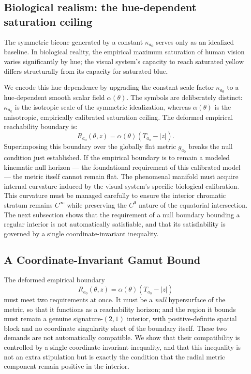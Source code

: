 \documentclass[preprint,12pt,authoryear]{elsarticle}
\theoremstyle{plain}
\theoremstyle{definition}
\theoremstyle{remark}
\begin{document}
\subsection{Biological realism: the hue-dependent saturation ceiling}
\label{subsec:biological-realism-squashing-function}

The symmetric bicone generated by a constant $\kappa_{a_0}$ serves only as an idealized baseline. In biological reality, the empirical maximum saturation of human vision varies significantly by hue; the visual system's capacity to reach saturated yellow differs structurally from its capacity for saturated blue.

We encode this hue dependence by upgrading the constant scale factor $\kappa_{a_0}$ to a hue-dependent smooth scalar field $\alpha(\theta)$. The symbols are deliberately distinct: $\kappa_{a_0}$ is the isotropic scale of the symmetric idealization, whereas $\alpha(\theta)$ is the anisotropic, empirically calibrated saturation ceiling. The deformed empirical reachability boundary is:
\[
R_{a_0}(\theta,z)=\alpha(\theta)(T_{a_0}-|z|).
\]
Superimposing this boundary over the globally flat metric $g_{a_0}$ breaks the null condition just established. If the empirical boundary is to remain a modeled kinematic null horizon --- the foundational requirement of this calibrated model --- the metric itself cannot remain flat. The phenomenal manifold must acquire internal curvature induced by the visual system's specific biological calibration. This curvature must be managed carefully to ensure the interior chromatic stratum remains $C^\infty$ while preserving the $C^0$ nature of the equatorial intersection. The next subsection shows that the requirement of a null boundary bounding a regular interior is not automatically satisfiable, and that its satisfiability is governed by a single coordinate-invariant inequality.

\subsection{A Coordinate-Invariant Gamut Bound}
\label{subsec:eikonal-constraint}

\noindent The deformed empirical boundary
\[
R_{a_0}(\theta,z)=\alpha(\theta)(T_{a_0}-|z|)
\]
must meet two requirements at once. It must be a \emph{null} hypersurface of the metric, so that it functions as a reachability horizon; and the region it bounds must remain a genuine signature-$(2,1)$ interior, with positive-definite spatial block and no coordinate singularity short of the boundary itself. These two demands are not automatically compatible. We show that their compatibility is controlled by a single coordinate-invariant inequality, and that this inequality is not an extra stipulation but is exactly the condition that the radial metric component remain positive in the interior.
\end{document}
